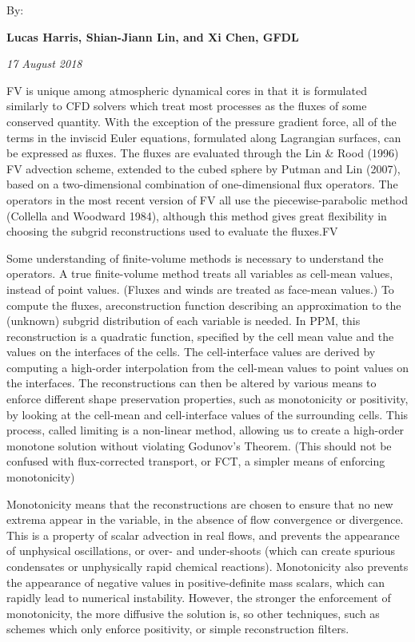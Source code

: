 By\-:

{\bfseries Lucas Harris, Shian-\/\-Jiann Lin, and Xi Chen, G\-F\-D\-L}

{\itshape 17 August 2018}

F\-V is unique among atmospheric dynamical cores in that it is formulated similarly to C\-F\-D solvers which treat most processes as the fluxes of some conserved quantity. With the exception of the pressure gradient force, all of the terms in the inviscid Euler equations, formulated along Lagrangian surfaces, can be expressed as fluxes. The fluxes are evaluated through the Lin \& Rood (1996) F\-V advection scheme, extended to the cubed sphere by Putman and Lin (2007), based on a two-\/dimensional combination of one-\/dimensional flux operators. The operators in the most recent version of F\-V all use the piecewise-\/parabolic method (Collella and Woodward 1984), although this method gives great flexibility in choosing the subgrid reconstructions used to evaluate the fluxes.\-F\-V

Some understanding of finite-\/volume methods is necessary to understand the operators. A true finite-\/volume method treats all variables as cell-\/mean values, instead of point values. (Fluxes and winds are treated as face-\/mean values.) To compute the fluxes, a ​reconstruction​ function describing an approximation to the (unknown) subgrid distribution of each variable is needed. In P\-P\-M, this reconstruction is a quadratic function, specified by the cell mean value and the values on the interfaces of the cells. The cell-\/interface values are derived by computing a high-\/order interpolation from the cell-\/mean values to point values on the interfaces. The reconstructions can then be altered by various means to enforce different shape preservation properties, such as monotonicity or positivity, by looking at the cell-\/mean and cell-\/interface values of the surrounding cells. This process, called ​limiting​ is a ​non-\/linear​ method, allowing us to create a high-\/order monotone solution without violating Godunov’s Theorem. (This should not be confused with flux-\/corrected transport, or F\-C\-T, a simpler means of enforcing monotonicity)

Monotonicity means that the reconstructions are chosen to ensure that no new extrema appear in the variable, in the absence of flow convergence or divergence. This is a property of scalar advection in real flows, and prevents the appearance of unphysical oscillations, or over-\/ and under-\/shoots (which can create spurious condensates or unphysically rapid chemical reactions). Monotonicity also prevents the appearance of negative values in positive-\/definite mass scalars, which can rapidly lead to numerical instability. However, the stronger the enforcement of monotonicity, the more diffusive the solution is, so other techniques, such as schemes which only enforce positivity, or simple reconstruction filters.

